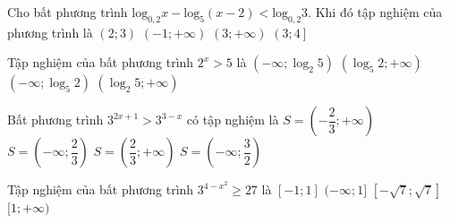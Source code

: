 \begin{ex}%
	Cho bất phương trình $\mathrm{log}_{0{,}2}x-\mathrm{log}_5(x-2)<\mathrm{log}_{0{,}2}3$. Khi đó tập  nghiệm của phương trình là
	 \choice
		{\True $(2;3)$} 
		{$(-1;+\infty)$} 
		{$(3;+\infty)$} 
		 {$\left(3;4\right]$}
\end{ex}

\begin{ex}%
	 Tập nghiệm của bất phương trình $2^{x}>5$ là
	\choice 
		{$(-\infty;\log_{2}{5})$} 
		{$(\log_{5}{2};+\infty)$} 
		{$(-\infty;\log_{5}{2})$} 
		 {\True $(\log_{2}{5};+\infty)$}
\end{ex}

\begin{ex}%
	Bất phương trình $3^{2x+1}>3^{3-x}$ có tập nghiệm  là
	 \choice
		{$S=\left(-\dfrac{2}{3};+\infty\right)$} 
		{$S=\left(-\infty;\dfrac{2}{3}\right)$} 
		{\True $S=\left(\dfrac{2}{3};+\infty\right)$} 
		{$S=\left(-\infty;\dfrac{3}{2}\right)$} 
\end{ex}

\begin{ex}%
	Tập nghiệm của  bất phương trình ${3^{4-{x^2}}}\ge 27$ là
	\choice 
		 {\True $[-1;1]$}
		 { $( -\infty;1]$}
		{ $\left[-\sqrt {7};\sqrt {7} \right]$} 
		{ $[1;+\infty)$} 
\end{ex}

